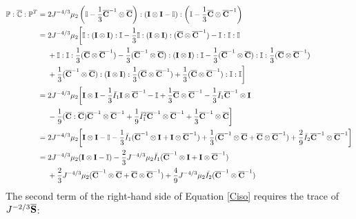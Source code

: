 \begin{equation} \label{part11}
\begin{split}
\mathbb{P} : {\overline{\mathbb{C}}} : {\mathbb{P}}^T 
= {} & 2J^{-4/3}\mu_2 \left(\mathbb{I} - \frac{1}{3}{\overline{\bold{C}}}^{-1} \otimes \overline{\bold{C}}\right)
: (\bold{I} \otimes \bold{I} - \mathbb{I}) : \left(\mathbb{I} - \frac{1}{3}\overline{\bold{C}} \otimes {\overline{\bold{C}}}^{-1}\right) \\
= {} & 2J^{-4/3}\mu_2 \bigg[\mathbb{I} : (\bold{I} \otimes \bold{I}) : \mathbb{I} - \frac{1}{3}\mathbb{I} : (\bold{I} \otimes \bold{I}) : (\overline{{\bold{C}}} \otimes {\overline{\bold{C}}}^{-1}) - \mathbb{I} : \mathbb{I} : \mathbb{I} \\
&+ \mathbb{I} : \mathbb{I} : \frac{1}{3}(\overline{\bold{C}} \otimes {\overline{\bold{C}}}^{-1}) - 
\frac{1}{3}({\overline{\bold{C}}}^{-1} \otimes \overline{\bold{C}} ) : (\bold{I} \otimes \bold{I}) : \mathbb{I}
- \frac{1}{3}({\overline{\bold{C}}}^{-1} \otimes \overline{\bold{C}} ) :  \mathbb{I} : \frac{1}{3}({\overline{\bold{C}}} \otimes {\overline{\bold{C}} }^{-1}) \\
&+ \frac{1}{3}(\overline{{\bold{C}}}^{-1} \otimes \overline{\bold{C}} ) : (\bold{I} \otimes \bold{I}) : \frac{1}{3}({\overline{\bold{C}}} \otimes {\overline{\bold{C}}}^{-1} ) + \frac{1}{3}({\overline{\bold{C}}} \otimes {\overline{\bold{C}}}^{-1}) : \mathbb{I} : \mathbb{I}
\bigg] \\
= {} & 2J^{-4/3}\mu_2 \bigg[\bold{I} \otimes \bold{I} - \frac{1}{3}\bar{I}_1\bold{I} \otimes {\overline{\bold{C}}}^{-1} - \mathbb{I} + \frac{1}{3}\overline{\bold{C}} \otimes {\overline{\bold{C}}}^{-1} -  \frac{1}{3}\bar{I}_1{\overline{\bold{C}}}^{-1} \otimes \bold{I}\\
&- \frac{1}{9}(\overline{\bold{C}} : \overline{\bold{C}}){\overline{\bold{C}}}^{-1} \otimes {\overline{\bold{C}}}^{-1} + \frac{1}{9}{\bar{I}_1}^2{\overline{\bold{C}}}^{-1} \otimes {\overline{\bold{C}}}^{-1} +  \frac{1}{3}{\overline{\bold{C}}}^{-1} \otimes {\overline{\bold{C}}} \bigg] \\
= {} & 2{J}^{-4/3}\mu_2 \bigg[ \bold{I} \otimes \bold{I} - \mathbb{I} - \frac{1}{3}\bar{I}_1({\overline{\bold{C}}}^{-1} \otimes \bold{I} + \bold{I}\otimes{\overline{\bold{C}}}^{-1} ) +
\frac{1}{3}({\overline{\bold{C}}}^{-1} \otimes \overline{\bold{C}} + \overline{\bold{C}}\otimes{\overline{\bold{C}}}^{-1} )  + \frac{2}{9}\bar{I}_2 {\overline{\bold{C}}}^{-1} \otimes {\overline{\bold{C}}}^{-1} \bigg] \\
= {} & 2{J}^{-4/3}\mu_2(\bold{I} \otimes \bold{I} - \mathbb{I}) - \frac{2}{3}J^{-4/3}\mu_2\bar{I}_1({\overline{\bold{C}}}^{-1} \otimes \bold{I} + \bold{I} \otimes {\overline{\bold{C}}}^{-1}) \\
&+
\frac{2}{3}J^{-4/3}\mu_2({\overline{\bold{C}}}^{-1} \otimes {\overline{\bold{C}}} + {\overline{\bold{C}}} \otimes {\overline{\bold{C}}}^{-1}) + \frac{4}{9}J^{-4/3}\mu_2\bar{I_2}({\overline{\bold{C}}}^{-1} \otimes {\overline{\bold{C}}}^{-1})
\end{split}
\end{equation}
The second term of the right-hand side of Equation \ref{Ciso} requires the trace of $J^{-2/3}\overline{\bold{S}}$:

